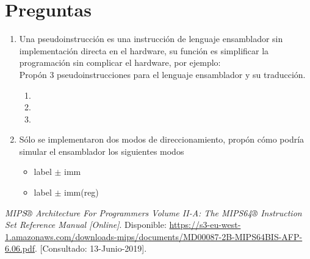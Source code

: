 \documentclass{article}
\begin{document}
    \section{Preguntas}
    \begin{enumerate}

    \item {
    Una pseudoinstrucción es una instrucción de lenguaje ensamblador sin implementación directa en el hardware, su función es simplificar la programación sin complicar el hardware, por ejemplo:\\

    Propón 3 pseudoinstrucciones para el lenguaje ensamblador y su traducción.\\
	
	\begin{enumerate}
		\item {
		
		}
		\item {
		
		}
		\item {
		
		}
	\end{enumerate}
	}

	\item {
	Sólo se implementaron dos modos de direccionamiento, propón cómo podría
	simular el ensamblador los siguientes modos \\

	\begin{itemize}
		\item {
			label $\pm$ imm
		}
		\item {
			label $\pm$ imm(reg)
		}
	\end{itemize}

	}

    \end{enumerate}

 \begin{thebibliography}{1}
	\textit{MIPS® Architecture For Programmers Volume II-A: The MIPS64® Instruction Set Reference Manual [Online]}. Disponible:
	\url{https://s3-eu-west-1.amazonaws.com/downloads-mips/documents/MD00087-2B-MIPS64BIS-AFP-6.06.pdf}.
	[Consultado: 13-Junio-2019].


\end{thebibliography}
\end{document}
